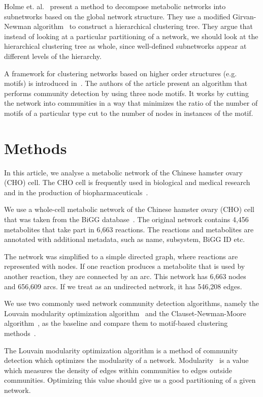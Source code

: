Holme et. al.~\cite{holme2003subnetwork} present a method to decompose metabolic
networks into subnetworks based on the global network structure. They use a
modified Girvan-Newman algorithm~\cite{girvan2002community} to construct a
hierarchical clustering tree. They argue that instead of looking at a particular
partitioning of a network, we should look at the hierarchical clustering tree as
whole, since well-defined subnetworks appear at different levels of the
hierarchy.

A framework for clustering networks based on higher order structures
(e.g. motifs) is introduced in~\cite{benson2016higher}. The authors of the
article present an algorithm that performs community detection by using three
node motifs. It works by cutting the network into communities in a way that
minimizes the ratio of the number of motifs of a particular type cut to the
number of nodes in instances of the motif.

\section{Methods}
\label{sec:methods}

In this article, we analyse a metabolic network of the Chinese hamster
ovary (CHO) cell. The CHO cell is frequently used in biological and medical
research and in the production of biopharmaceuticals~\cite{chocons}.

We use a whole-cell metabolic network of the Chinese hamster ovary (CHO)
cell that was taken from the BiGG database~\cite{bigg,chocons}. The original
network contains 4,456 metabolites that take part in 6,663 reactions. The
reactions and metabolites are annotated with additional metadata, such as name,
subsystem, BiGG ID etc.

The network was simplified to a simple directed graph, where reactions are
represented with nodes. If one reaction produces a metabolite that is used by
another reaction, they are connected by an arc. This network has 6,663 nodes and
656,609 arcs. If we treat as an undirected network, it has 546,208 edges.

We use two commonly used network community detection algorithms, namely the
Louvain modularity optimization algorithm~\cite{blondel2008fast} and the
Clauset-Newman-Moore algorithm~\cite{clauset2004finding}, as the baseline and
compare them to motif-based clustering methods~\cite{benson2016higher}.

The Louvain modularity optimization algorithm is a method of community detection
which optimizes the modularity of a
network. Modularity~\cite{girvan2002community} is a value which measures the
density of edges within communities to edges outside communities. Optimizing
this value should give us a good partitioning of a given network.

